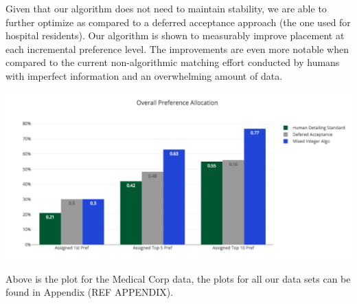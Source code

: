 Given that our algorithm does not need to maintain stability, we are able to further optimize as compared to a deferred acceptance approach (the one used for hospital residents).  Our algorithm is shown to measurably improve placement at each incremental preference level. The improvements are even more notable when compared to the current non-algorithmic matching effort conducted by humans with imperfect information and an overwhelming amount of data.  

\begin{center}
\includegraphics[scale=0.75]{Sections/figures/med_bar.png}
\end{center}

Above is the plot for the Medical Corp data, the plots for all our data sets can be found in Appendix (REF APPENDIX).


